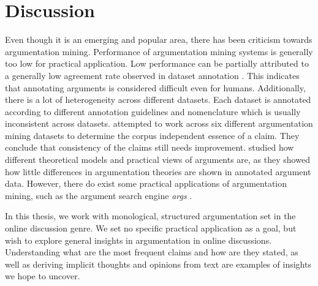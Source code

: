 \section{Discussion}
\label{sec:area_discussion}

Even though it is an emerging and popular area, there has been criticism
towards argumentation mining.  Performance of argumentation mining systems is
generally too low for practical application. Low performance can be partially
attributed to a generally low agreement rate observed in dataset annotation
\citep{peldszus2015joint, boltuzic2017toward}. This indicates that annotating
arguments is considered difficult even for humans. Additionally, there is a lot
of heterogeneity across different datasets. Each dataset is annotated according
to different annotation guidelines and nomenclature which is usually
inconsistent across datasets.  \citet{daxenberger2017essence} attempted to work
across six different argumentation mining datasets to determine the corpus
independent essence of a claim.  They conclude that consistency of the claims
still needs improvement.  \citet{wachsmuth2017argumentation} studied how
different theoretical models and practical views of arguments are, as they
showed how little differences in argumentation theories are shown in annotated
argument data.  However, there do exist some practical applications of
argumentation mining, such as the argument search engine \emph{args}
\citep{wachsmuth2017building}.

In this thesis, we work with monological, structured argumentation set in the
online discussion genre.  We set no specific practical application as a goal,
but wish to explore general insights in argumentation in online discussions. 
Understanding what are the most frequent claims and how are they 
stated, as well as deriving implicit thoughts and opinions from text 
are examples of insights we hope to uncover. 
